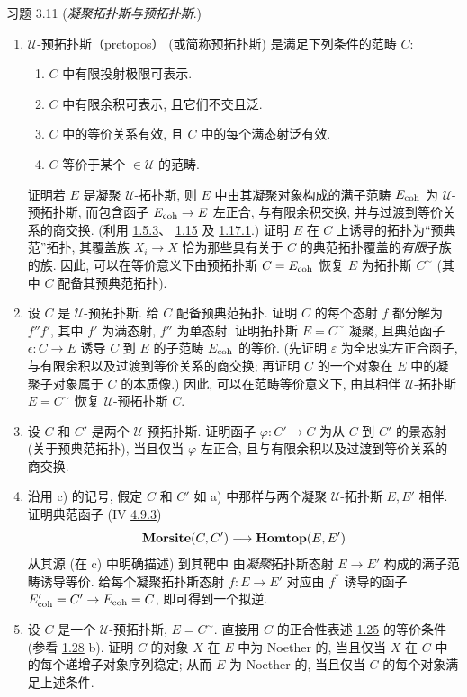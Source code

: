 \begin{enonce*}[remark]{习题 3.11}
(\emph{凝聚拓扑斯与预拓扑斯}.)
\begin{enumerate}
\renewcommand{\theenumi}{\alph {enumi}}
\renewcommand{\labelenumi}{\theenumi)}
\item $𝒰$-预拓扑斯（pretopos）
(或简称预拓扑斯) 是满足下列条件的范畴 $C$:
\begin{enumerate}
\renewcommand{\theenumii}{\arabic{enumii}}
\renewcommand{\labelenumii}{\theenumii)}
\item $C$ 中有限投射极限可表示.

\item $C$ 中有限余积可表示, 且它们不交且泛.

\item $C$ 中的等价关系有效, 且 $C$ 中的每个满态射泛有效.

\item $C$ 等价于某个 $\in 𝒰$ 的范畴.
\end{enumerate}
证明若 $E$ 是凝聚 $𝒰$-拓扑斯,
则 $E$ 中由其凝聚对象构成的满子范畴 $E_{\mathrm{coh}}$ 为 $𝒰$-预拓扑斯,
而包含函子 $E_{\coh}\to E$ 左正合,
与\pageoriginale{}有限余积交换,
并与过渡到等价关系的商交换.
(利用 \hyperref[VI.subsubsec1.5.3]{1.5.3}、
\hyperref[VI.cor1.15]{1.15} 及 \hyperref[VI.cor1.17.1]{1.17.1}.)
证明 $E$ 在 $C$ 上诱导的拓扑为“预典范”拓扑,
\ie 其覆盖族 $X_i\to X$
恰为那些具有关于 $C$ 的典范拓扑覆盖的\emph{有限}子族的族.
因此, 可以在等价意义下由预拓扑斯 $C=E_{\mathrm{coh}}$
恢复 $E$ 为拓扑斯 $C^{\sim}$
(其中 $C$ 配备其预典范拓扑).

\item 设 $C$ 是 $𝒰$-预拓扑斯.
给 $C$ 配备预典范拓扑.
证明 $C$ 的每个态射 $f$ 都分解为 $f''f'$,
其中 $f'$ 为满态射, $f''$ 为单态射.
证明拓扑斯 $E=C^{\sim}$ 凝聚,
且典范函子 $\epsilon:C\to E$
诱导 $C$ 到 $E$ 的子范畴 $E_{\mathrm{coh}}$ 的等价.
(先证明 $\varepsilon$ 为全忠实左正合函子,
与有限余积以及过渡到等价关系的商交换;
再证明 $C$ 的一个对象在 $E$ 中的凝聚子对象属于 $C$ 的本质像.)
因此, 可以在范畴等价意义下,
由其相伴 $𝒰$-拓扑斯 $E=C^{\sim}$ 恢复 $𝒰$-预拓扑斯 $C$.

\item 设 $C$ 和 $C'$ 是两个 $𝒰$-预拓扑斯.
证明函子 $\varphi:C'\to C$
为从 $C$ 到 $C'$ 的景态射 (关于预典范拓扑),
当且仅当 $\varphi$ 左正合,
且与有限余积以及过渡到等价关系的商交换.

\item 沿用\pageoriginale{} c) 的记号,
假定 $C$ 和 $C'$ 如 a) 中那样与两个凝聚 $𝒰$-拓扑斯 $E,E'$ 相伴.
证明典范函子 (IV \hyperref[IV.subsubsec4.9.3]{4.9.3})
$$
\Mmorsite(C,C')\to\Hhomtop(E,E')
$$
从其源 (在 c) 中明确描述) 到其靶中
由\emph{凝聚}拓扑斯态射 $E\to E'$ 构成的满子范畴诱导等价.
给每个凝聚拓扑斯态射 $f:E\to E'$
对应由 $f^{\ast}$ 诱导的函子 $E'_{\coh}=C'\to E_{\coh}=C$,
即可得到一个拟逆.

\item 设 $C$ 是一个 $𝒰$-预拓扑斯, $E=C^{\sim}$.
直接用 $C$ 的正合性表述 \hyperref[VI.cor1.25]{1.25} 的等价条件
(参看 \hyperref[VI.exer1.28]{1.28} b).
证明 $C$ 的对象 $X$ 在 $E$ 中为 Noether 的,
当且仅当 $X$ 在 $C$ 中的每个递增子对象序列稳定;
从而 $E$ 为 Noether 的,
当且仅当 $C$ 的每个对象满足上述条件.
\end{enumerate}
\end{enonce*}

